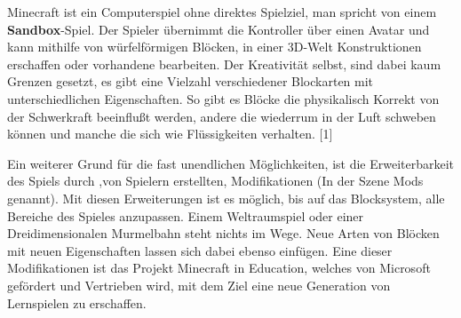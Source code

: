 Minecraft ist ein Computerspiel ohne direktes Spielziel, man spricht von einem \textbf{Sandbox}-Spiel.
Der Spieler übernimmt die Kontroller über einen Avatar und kann mithilfe von würfelförmigen Blöcken,
in einer 3D-Welt Konstruktionen erschaffen oder vorhandene bearbeiten. Der Kreativität selbst,
sind dabei kaum Grenzen gesetzt, es gibt eine Vielzahl verschiedener Blockarten mit unterschiedlichen
Eigenschaften. So gibt es Blöcke die physikalisch Korrekt von der Schwerkraft beeinflußt werden,
andere die wiederrum in der Luft schweben können und manche die sich wie Flüssigkeiten verhalten.
[1]

Ein weiterer Grund für die fast unendlichen Möglichkeiten, ist die Erweiterbarkeit des Spiels durch
,von Spielern erstellten, Modifikationen (In der Szene Mods genannt). Mit diesen Erweiterungen ist es
möglich, bis auf das Blocksystem, alle Bereiche des Spieles anzupassen. Einem Weltraumspiel oder einer
Dreidimensionalen Murmelbahn steht nichts im Wege. Neue Arten von Blöcken mit neuen Eigenschaften lassen
sich dabei ebenso einfügen. Eine dieser Modifikationen ist das Projekt Minecraft in Education, welches
von Microsoft gefördert und Vertrieben wird, mit dem Ziel eine neue Generation von Lernspielen zu erschaffen.
